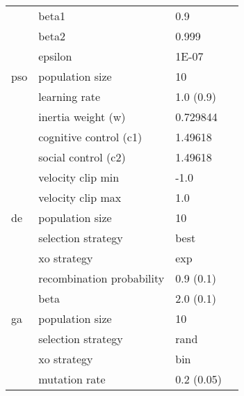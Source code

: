 \begin{table}[H]
{\begin{tabular}{llll}
			                   & beta1                     & 0.9            &                           \\
			                   & beta2                     & 0.999          &                           \\
			                   & epsilon                   & 1E-07          &                           \\
			pso                & population size           & 10             & \cite{ref:van:2010}       \\
			                   & learning rate             & 1.0 (0.9)      &                           \\
			                   & inertia weight (w)        & 0.729844       &                           \\
			                   & cognitive control (c1)    & 1.49618        &                           \\
			                   & social control (c2)       & 1.49618        &                           \\
			                   & velocity clip min         & -1.0           &                           \\
			                   & velocity clip max         & 1.0            &                           \\
			de                 & population size           & 10             & \cite{ref:mezura:2006}    \\
			                   & selection strategy        & best           &                           \\
			                   & xo strategy               & exp            &                           \\
			                   & recombination probability & 0.9 (0.1)      &                           \\
			                   & beta                      & 2.0 (0.1)      &                           \\
			ga                 & population size           & 10             & \cite{ref:lambora:2019}   \\
			                   & selection strategy        & rand           &                           \\
			                   & xo strategy               & bin            &                           \\
			                   & mutation rate             & 0.2 (0.05)     &                           \\
		\end{tabular}%
	}
\end{table}%
